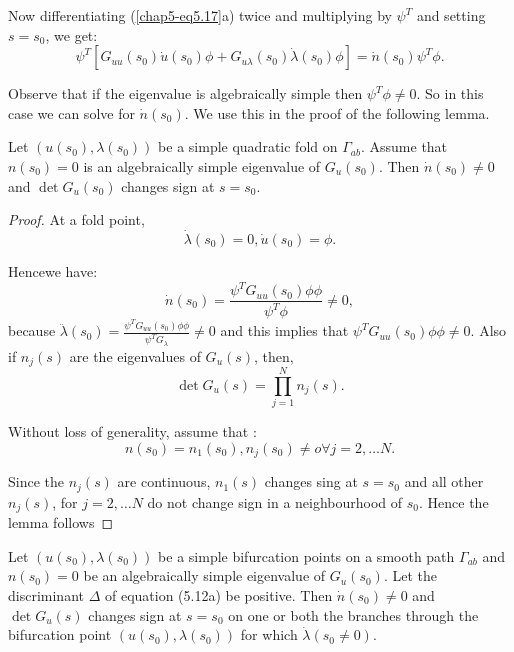Now differentiating (\ref{chap5-eq5.17}a) twice and multiplying by
$\psi^{T}$ and setting $s = s_{0}$, we get: 
\begin{equation*}
\psi^{T}[G_{uu}(s_{0})\dot{u} (s_{0}) \phi + G_{u \lambda}
  (s_{0})\dot{\lambda}
  (s_{0}) \phi] = \dot{n}(s_{0}) \psi^{T}
\phi. \tag{5.18} \label{chap5-eq5.18} 
\end{equation*}

Observe that if the eigenvalue is algebraically simple then $\psi^{T}
\phi \neq 0$. So in this case we can solve for $\dot{n}(s_{0})$. We
use this in the proof of the following lemma.  

\setcounter{chaplemma}{18}
\begin{chaplemma}\label{chap5-lem5.19}
Let $(u(s_{0}), \lambda(s_{0}))$ be a simple quadratic fold on
$\Gamma_{ab}$. Assume that $n (s_{0}) = 0$ is an algebraically simple 
eigenvalue of $G_{u}(s_{0})$. Then $\dot{n}(s_{0}) \neq 0$ and $\det
G_{u}(s_{0})$ changes sign at $s = s_{0}$. 
\end{chaplemma}

\begin{proof}%
At a fold point, 
$$
\dot{\lambda}(s_{0}) = 0, \dot{u}(s_{0}) = \phi.
$$

Hence\pageoriginale we have:
$$
\dot{n}(s_{0}) = \frac{\psi^{T}G_{uu}(s_{0}) \phi\phi}{\psi^{T}\phi}
\neq 0, 
$$
because $\ddot{\lambda}(s_{0}) = \frac{\psi^{T}G_{uu}(s_{0})
  \phi\phi}{\psi^{T}G_{\lambda}} \neq 0$ and this implies that
$\psi^{T}G_{uu}(s_{0}) \phi\phi \neq 0$. 
Also if $n_{j}(s)$ are the eigenvalues of $G_{u}(s)$, then, 
$$
\det G_{u}(s) = \prod\limits^{N}_{j=1} n_{j}(s).
$$

Without loss of generality, assume that :
$$
n(s_{0}) = n_{1}(s_{0}), n_{j}(s_{0}) \neq o \forall j = 2, \ldots N.
$$

Since the $n_{j}(s)$ are continuous, $n_{1}(s)$ changes sing at $s =
s_{0}$ and all other $n_{j}(s)$, for $j = 2, \ldots N$ do not change
sign in a neighbourhood of $s_{0}$. Hence the lemma follows    
\end{proof}

\begin{chaplemma}\label{chap5-lem5.20}
Let $(u(s_{0}), \lambda(s_{0}))$ be a simple bifurcation
  points on a smooth path $\Gamma_{ab}$ and $n (s_{0}) = 0$ be an
  algebraically simple eigenvalue of $G_{u}(s_{0})$. Let the
  discriminant $\Delta$ of equation (5.12a) be positive. Then
  $\dot{n}(s_{0}) \neq 0$ and $\det G_{u}(s)$ changes sign at $s =
  s_{0}$ on one or both the branches through the bifurcation point
  $(u(s_{0}), \lambda (s_{0}))$ for which $\dot{\lambda} (s_{0} \neq
  0)$. 
\end{chaplemma}

